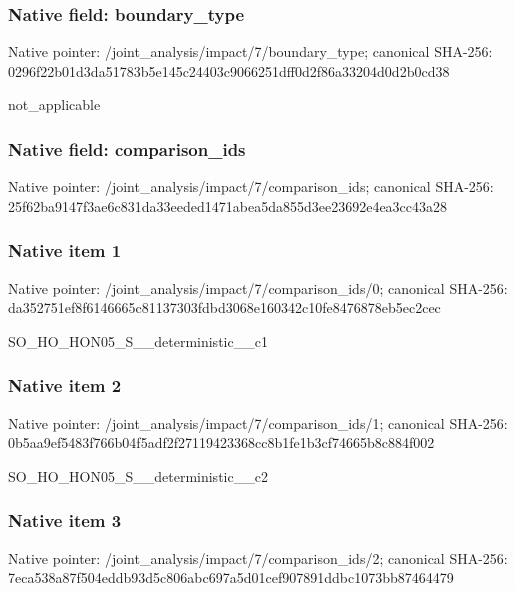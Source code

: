 \documentclass[10pt,a4paper]{article}
\begin{document}
\subsubsection{Native field: boundary\_\allowbreak{}type}
Native pointer: /joint\_\allowbreak{}analysis/impact/7/boundary\_\allowbreak{}type; canonical SHA-256: 0296f22b01d3da51783b5e145c24403c9066251dff0d2f86a33204d0d2b0cd38

\begingroup\raggedright\sloppy not\_\allowbreak{}applicable\par\endgroup

\subsubsection{Native field: comparison\_\allowbreak{}ids}
Native pointer: /joint\_\allowbreak{}analysis/impact/7/comparison\_\allowbreak{}ids; canonical SHA-256: 25f62ba9147f3ae6c831da33eeded1471abea5da855d3ee23692e4ea3cc43a28

\subsubsection{Native item 1}
Native pointer: /joint\_\allowbreak{}analysis/impact/7/comparison\_\allowbreak{}ids/0; canonical SHA-256: da352751ef8f6146665c81137303fdbd3068e160342c10fe8476878eb5ec2cec

\begingroup\raggedright\sloppy SO\_\allowbreak{}HO\_\allowbreak{}HON05\_\allowbreak{}S\_\allowbreak{}\_\allowbreak{}deterministic\_\allowbreak{}\_\allowbreak{}c1\par\endgroup

\subsubsection{Native item 2}
Native pointer: /joint\_\allowbreak{}analysis/impact/7/comparison\_\allowbreak{}ids/1; canonical SHA-256: 0b5aa9ef5483f766b04f5adf2f27119423368cc8b1fe1b3cf74665b8c884f002

\begingroup\raggedright\sloppy SO\_\allowbreak{}HO\_\allowbreak{}HON05\_\allowbreak{}S\_\allowbreak{}\_\allowbreak{}deterministic\_\allowbreak{}\_\allowbreak{}c2\par\endgroup

\subsubsection{Native item 3}
Native pointer: /joint\_\allowbreak{}analysis/impact/7/comparison\_\allowbreak{}ids/2; canonical SHA-256: 7eca538a87f504eddb93d5c806abc697a5d01cef907891ddbc1073bb87464479
\end{document}

